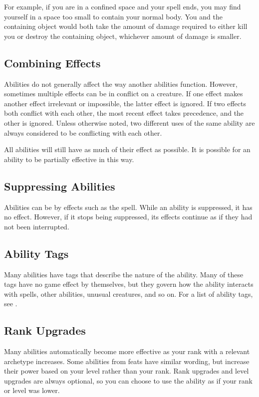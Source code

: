     For example, if you are in a confined space and your  spell ends, you may find yourself in a space too small to contain your normal body.
    You and the containing object would both take the amount of damage required to either kill you or destroy the containing object, whichever amount of damage is smaller.

  \subsection{Combining Effects}
    Abilities do not generally affect the way another abilities function.
    However, sometimes multiple effects can be in conflict on a creature.
    If one effect makes another effect irrelevant or impossible, the latter effect is ignored.
    If two effects both conflict with each other, the most recent effect takes precedence, and the other is ignored.
    Unless otherwise noted, two different uses of the same ability are always considered to be conflicting with each other.

    All abilities will still have as much of their effect as possible.
    It is possible for an ability to be partially effective in this way.

  \subsection{Suppressing Abilities}\label{Suppressing Abilities}
    Abilities can be  by effects such as the  spell.
    While an ability is suppressed, it has no effect.
    However, if it stops being suppressed, its effects continue as if they had not been interrupted.

  \subsection{Ability Tags}
    Many abilities have tags that describe the nature of the ability.
    Many of these tags have no game effect by themselves, but they govern how the ability interacts with spells, other abilities, unusual creatures, and so on.
    For a list of ability tags, see .

  \subsection{Rank Upgrades}
    Many abilities automatically become more effective as your rank with a relevant archetype increases.
    Some abilities from feats have similar wording, but increase their power based on your level rather than your rank.
    Rank upgrades and level upgrades are always optional, so you can choose to use the ability as if your rank or level was lower.

